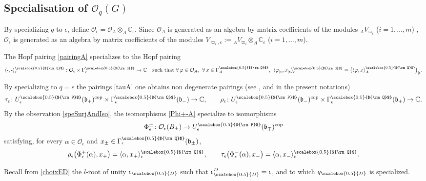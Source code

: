 \documentclass[11pt]{amsart}
\newcommand{\e}{\epsilon}
\newcommand{\mc}{\mathbb{C}}
\newcommand{\Oo}{\mathcal{O}}
\newcommand{\qD}{q_{\scalebox{0.5}{D}}}
\newcommand{\eD}{\epsilon_{\scalebox{0.5}{D}}}
\newcommand{\Q}{{\scalebox{0.5}{${\rm Q}$}}}
\newcommand{\Pup}{{\scalebox{0.5}{${\rm P}$}}}
\begin{document}
\subsection {Specialisation of \texorpdfstring{${\mathcal O}_q(G)$}{the quantum function algebra}}\label{specialisOA} 

By specializing $q$ to $\e$, define ${\mathcal O}_\epsilon={\mathcal O}_A\otimes_A {\mathbb C}_{\epsilon}$. Since $\Oo_A$ is generated as an algebra by matrix coefficients of the modules ${}_A V_{\varpi_i}$ ($i=1,\ldots,m$) \cite{Lusztig2}, $\Oo_\e$ is generated as an algebra by matrix coefficients of the modules $V_{\varpi_i,\e}:={_AV_{\varpi_i}} \otimes_A \mathbb{C}_\e$ ($i=1,\ldots,m$). 

The Hopf pairing \eqref{pairingA} specializes to the Hopf pairing 
\begin{equation}\label{nondegpaireps}
\langle \text{-}, \text{-} \rangle_\epsilon^\Q :{\mathcal O}_\epsilon\times \Gamma_\epsilon^\Q\to {\mathbb C} \quad \text{such that } \forall \, \varphi \in \Oo_A, \:\: \forall \, x \in \Gamma_A^\Q, \:\: \langle \varphi_{|\e}, x_{|\e} \rangle_\e^\Q = \bigl( \langle \varphi, x \rangle^\Q_A \bigr)_{|\e}.
\end{equation}

\indent By specializing to $q=\e$ the pairings \eqref{tauA} one obtains non degenerate pairings (see \cite[\S 6]{DC-L}, and \cite[Th.\,2.20 and 2.29]{BR2} in the present notations)
\begin{equation}\label{taue}
\tau_\e\colon U_\e^\Pup(\mathfrak{b}_+)^{\rm cop}\times \Gamma_\e^\Q(\mathfrak{b}_-)\to \mc, \qquad \rho_\e\colon U_\e^\Pup(\mathfrak{b}_-)^{\rm cop}\times \Gamma_\e^\Q(\mathfrak{b}_+)\to \mc.
\end{equation}
By the observation \eqref{speSurjAndIso}, the isomorphisms \eqref{Phi+-A} specialize to isomorphisms 
\begin{equation}\label{Phi+-e}
\Phi_\e^\pm\colon \Oo_\e(B_\pm) \to U_\e^\Pup(\mathfrak{b}_\mp)^{\rm cop}
\end{equation}
satisfying, for every $\alpha\in \Oo_\e$ and $x_\pm\in \Gamma_\e^\Q(\mathfrak{b}_\pm)$,
\begin{equation}\label{identPhibrackete}
\rho_\e\bigl(\Phi_\e^+(\alpha),x_+\bigr) = \langle \alpha,x_+\rangle_\e^\Q, \qquad  \tau_\e\bigl(\Phi_\e^-(\alpha),x_-\bigr) = \langle \alpha,x_-\rangle_\e^\Q.
\end{equation}

\indent Recall from \eqref{choixED} the $l$-root of unity $\eD$ such that $\eD^D = \e$, and to which $\qD$ is specialized. 
\end{document}
